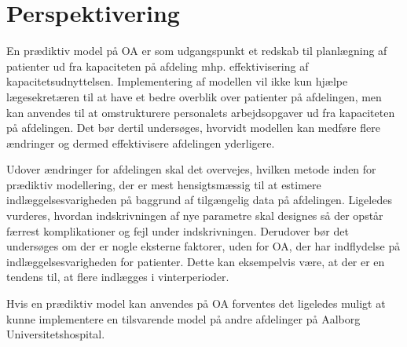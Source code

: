 \section{Perspektivering} 
En prædiktiv model på OA er som udgangspunkt et redskab til planlægning af patienter ud fra kapaciteten på afdeling mhp. effektivisering af kapacitetsudnyttelsen. Implementering af modellen vil ikke kun hjælpe lægesekretæren til at have et bedre overblik over patienter på afdelingen, men kan anvendes til at omstrukturere personalets arbejdsopgaver ud fra kapaciteten på afdelingen. Det bør dertil undersøges, hvorvidt modellen kan medføre flere ændringer og dermed effektivisere afdelingen yderligere. 


Udover ændringer for afdelingen skal det overvejes, hvilken metode inden for prædiktiv modellering, der er mest hensigtsmæssig til at estimere indlæggelsesvarigheden på baggrund af tilgængelig data på afdelingen. Ligeledes vurderes, hvordan indskrivningen af nye parametre skal designes så der opstår færrest komplikationer og fejl under indskrivningen. 
Derudover bør det undersøges om der er nogle eksterne faktorer, uden for OA, der har indflydelse på indlæggelsesvarigheden for patienter. Dette kan eksempelvis være, at der er en tendens til, at flere indlægges i vinterperioder.


Hvis en prædiktiv model kan anvendes på OA forventes det ligeledes muligt at kunne implementere en tilsvarende model på andre afdelinger på Aalborg Universitetshospital.


